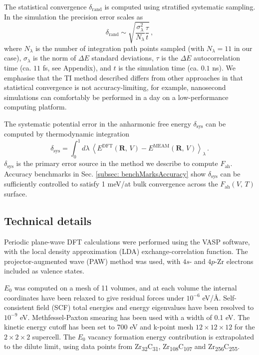 \documentclass[twocolumn,american,aps,prb,showpacs,showkeys,amsmath,amssymb,superscriptaddress,a4]{revtex4-1}
\begin{document}
The statistical convergence $\delta_{\text{rand}}$ is computed using stratified systematic sampling.\cite{Haile1997} In the simulation the precision error scales as\cite{Janke2002}
\begin{equation}
\delta_{\text{rand}}\sim\sqrt{\frac{\sigma^2_{\lambda}}{N_\lambda} \frac{\tau}{t}}\,,
\label{eq: statisticalPrecisionError}
\end{equation}
where $N_\lambda$ is the number of integration path points sampled (with $N_\lambda=11$ in our case), $\sigma_{\lambda}$ is the norm of $\Delta E$ standard deviations,  $\tau$ is the $\Delta E$ autocorrelation time (ca. $11$ fs, see Appendix), and $t$ is the simulation time (ca. $0.1$ ns). We emphasise that the TI method described differs from other approaches in that statistical convergence is
not accuracy-limiting, for example, nanosecond simulations can comfortably be performed in a day on a low-performance computing platform.

The systematic potential error in the anharmonic free energy $\delta_{\text{sys}}$
can be computed by thermodynamic integration
\begin{equation}
\delta_{\text{sys}}=\int_{0}^{1}d\lambda\,\left\langle E^{\text{DFT}}(\mathbf{R},\,V)-E^{\text{MEAM}}(\mathbf{R},\,V)\right\rangle _{\lambda}\,.
\label{eq: anharmonicFreeEnergyTI}
\end{equation}
$\delta_{\text{sys}}$ is the primary error source in the method we
describe to compute $F_{\text{ah}}$. Accuracy benchmarks in Sec.
\ref{subsec: benchMarksAccuracy} show $\delta_{\text{sys}}$ can
be sufficiently controlled to satisfy 1 meV/at bulk convergence across
the $F_{\text{ah}}(V,\,T)$ surface. 

\subsection{Technical details\label{subsec:Technical}}

Periodic plane-wave DFT calculations were
performed using the VASP software,\cite{Kresse1996,Kresse1996a} with
the local density approximation (LDA) exchange-correlation function.\cite{Perdew1981a}
The projector-augmented wave (PAW) method was used,\cite{Kresse1999}
with $4s$- and $4p$-Zr electrons included as valence states.

$E_{0}$ was computed on a mesh of 11 volumes, and at each volume the
internal coordinates have been relaxed to give residual forces under  $10^{-6}$ eV/\AA. 
Self-consistent field (SCF) 
total
energies and energy eigenvalues have been resolved to $10^{-9}$ eV. Methfessel-Paxton
smearing has been used with a width of 0.1 eV.\cite{Methfessel1989}
The kinetic energy cutoff has been set to 700 eV and k-point mesh
$12\times12\times12$ for the $2\times2\times2$ supercell. The $E_{0}$
vacancy formation energy contribution is extrapolated to the dilute
limit, using data points from Zr\textsubscript{32}C\textsubscript{31},
Zr\textsubscript{108}C\textsubscript{107} and Zr\textsubscript{256}C\textsubscript{255}.
\end{document}
